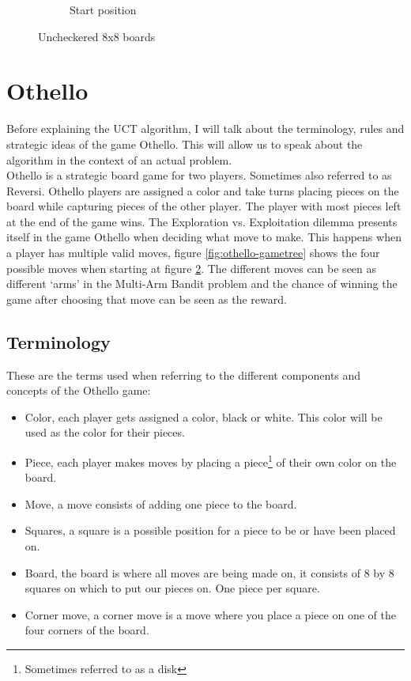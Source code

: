 \documentclass[
11pt, %
english, %
singlespacing, %
headsepline, %
]{MastersDoctoralThesis} %
\begin{document}
\begin{figure}
\begin{subfigure}{.4\textwidth}
		\caption{Start position}
		\label{fig:othello-startposition}		
	\end{subfigure}
	\caption{Uncheckered 8x8 boards}
\end{figure}
\section{Othello}
Before explaining the UCT algorithm, I will talk about the terminology, rules and strategic ideas of the game Othello. This will allow us to speak about the algorithm in the context of an actual problem.\\

Othello is a strategic board game for two players. Sometimes also referred to as Reversi. Othello players are assigned a color and take turns placing pieces on the board while capturing pieces of the other player. The player with most pieces left at the end of the game wins. The Exploration vs. Exploitation dilemma presents itself in the game Othello when deciding what move to make. This happens when a player has multiple valid moves, figure \ref{fig:othello-gametree} shows the four possible moves when starting at figure \ref{fig:othello-startposition}. The different moves can be seen as different `arms' in the Multi-Arm Bandit problem and the chance of winning the game after choosing that move can be seen as the reward.\\
\subsection{Terminology}
These are the terms used when referring to the different components and concepts of the Othello game:
\begin{itemize}
	\item Color, each player gets assigned a color, black or white. This color will be used as the color for their pieces.
	\item Piece, each player makes moves by placing a piece\footnote{Sometimes referred to as a disk} of their own color on the board.
	\item Move, a move consists of adding one piece to the board.
	\item Squares, a square is a possible position for a piece to be or have been placed on. 
	\item Board, the board is where all moves are being made on, it consists of 8 by 8 squares on which to put our pieces on. One piece per square.
	\item Corner move, a corner move is a move where you place a piece on one of the four corners of the board.

\end{itemize}
\end{document}
